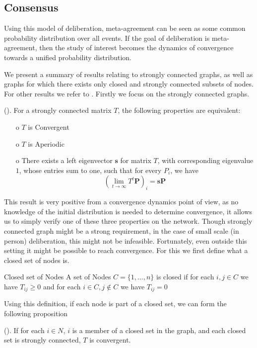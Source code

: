 \subsection{Consensus}
\label{sub: concensus DeGroot}
Using this model of deliberation, meta-agreement can be seen as some common probability distribution over all events. If the goal of deliberation is meta-agreement, then the study of interest becomes the dynamics of convergence towards a unified probability distribution.

We present a summary of results relating to strongly connected graphs, as well as graphs for which there exists only closed and strongly connected subsets of nodes. For other results we refer to \citet{golubNaiveLearningSocial2010}. Firstly we focus on the strongly connected graphs.

\begin{proposition}{(\citet{golubNaiveLearningSocial2010}).}
	For a strongly connected matrix \(T\), the following properties are equivalent:
	\begin{itemize}
		\item[o] \(T\) is Convergent
		\item[o] \(T\) is Aperiodic
		\item[o] There exists a left eigenvector \(\boldsymbol{s}\) for matrix \(T\), with corresponding eigenvalue \(1\), whose entries sum to one, such that for every $P_i$, we have
			\[\left(\lim_{t\to \infty}T^{t} \boldsymbol{P}\right)_{i} = \boldsymbol{s}\boldsymbol{P}\]
	\end{itemize}
\end{proposition}

This result is very positive from a convergence dynamics point of view, as no knowledge of the initial distribution is needed to determine convergence, it allows us to simply verify one of these three properties on the network. Though strongly connected graph might be a strong requirement, in the case of small scale (in person) deliberation, this might not be infeasible. Fortunately, even outside this setting it might be possible to reach convergence. For this we first define what a closed set of nodes is.

\begin{definition}{Closed set of Nodes}{}
	A set of Nodes \(C = \{1, \dots, n\}\) is closed if for each \(i,j \in C\) we have $T_{ij} \geq 0$ and for each \(i \in C, j \notin C\) we have \(T_{ij} = 0\)
\end{definition}

Using this definition, if each node is part of a closed set, we can form the following proposition

\begin{proposition}{(\citet{golubNaiveLearningSocial2010}).}
	If for each \(i \in N\), \(i\) is a member of a closed set in the graph, and each closed set is strongly connected, \(T\) is convergent.
\end{proposition}

